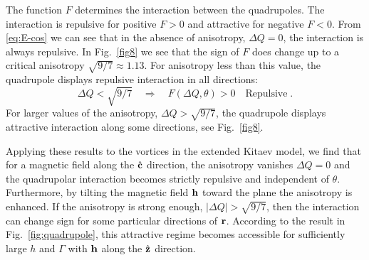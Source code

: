 The function $F$ determines the interaction between the quadrupoles. The interaction is repulsive for positive $F>0$ and attractive for negative $F<0$. From \eqref{eq:E-cos} we can see that in the absence of anisotropy, $\Delta Q=0$, the interaction is always repulsive. In Fig.~\ref{fig8} we see that the sign of $F$ does change up to a critical anisotropy $\sqrt{9/7}\approx 1.13$. For anisotropy less than this value, the quadrupole displays repulsive interaction in all directions:
\begin{equation}
    \Delta Q <  \sqrt{9/7} \quad \Rightarrow \quad F(\Delta Q , \theta) > 0   \quad \text{Repulsive} \; .
\end{equation}
For larger values of the anisotropy, $\Delta Q > \sqrt{9/7}$, the quadrupole displays attractive interaction along some directions, see Fig.~\ref{fig8}.

Applying these results to the vortices in the extended Kitaev model, we find that for a magnetic field along the $\hat {\mathbf c}$ direction,  the anisotropy vanishes $\Delta Q=0$ and the quadrupolar interaction becomes strictly repulsive and independent of $\theta$.  Furthermore, by tilting the magnetic field $\mathbf h$ toward the plane the anisotropy is enhanced.
If the anisotropy is strong enough, $|\Delta Q| > \sqrt{9/7}$, then the interaction can change sign for some particular directions of $\mathbf r$.
According to the result in Fig.~\ref{fig:quadrupole}, this attractive regime becomes accessible for sufficiently large $h$ and $\Gamma$ with $\mathbf h$ along the $\hat{\mathbf z}$ direction.




